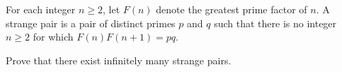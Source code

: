 For each integer $n \geq 2$,  let $F(n)$ denote the greatest prime factor of $n$. A strange pair is a pair of distinct primes $p$ and $q$ such that there is no integer $n \geq 2$ for which $F(n)F(n+1)=pq$.

Prove that there exist infinitely many strange pairs.
